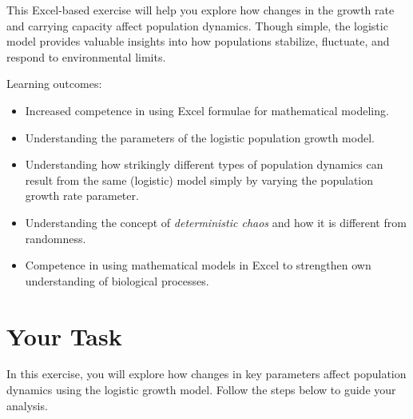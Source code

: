 \documentclass[
  a4paper]{book}
\providecommand{\tightlist}{%
  \setlength{\itemsep}{0pt}\setlength{\parskip}{0pt}}
\begin{document}
This Excel-based exercise will help you explore how changes in the growth rate and carrying capacity affect population dynamics. Though simple, the logistic model provides valuable insights into how populations stabilize, fluctuate, and respond to environmental limits.

\begin{do-something}
Learning outcomes:

\begin{itemize}
\tightlist
\item
  Increased competence in using Excel formulae for mathematical
  modeling.
\item
  Understanding the parameters of the logistic population growth model.
\item
  Understanding how strikingly different types of population dynamics
  can result from the same (logistic) model simply by varying the
  population growth rate parameter.
\item
  Understanding the concept of \emph{deterministic chaos} and how it is
  different from randomness.
\item
  Competence in using mathematical models in Excel to strengthen own
  understanding of biological processes.
\end{itemize}
\end{do-something}

\section{Your Task}\label{your-task-5}

In this exercise, you will explore how changes in key parameters affect population dynamics using the logistic growth model. Follow the steps below to guide your analysis.
\end{document}
